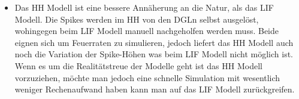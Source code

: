 \documentclass[conference]{IEEEtran}
\begin{document}
\begin{itemize}
\item Das HH Modell ist eine bessere Annäherung an die Natur, als das LIF Modell. Die Spikes werden im HH von den DGLn selbst ausgelöst, wohingegen beim LIF Modell manuell nachgeholfen werden muss. Beide eignen sich um Feuerraten zu simulieren, jedoch liefert das HH Modell auch noch die Variation der Spike-Höhen was beim LIF Modell nicht möglich ist. Wenn es um die Realitätstreue der Modelle geht ist das HH Modell vorzuziehen, möchte man jedoch eine schnelle Simulation mit wesentlich weniger Rechenaufwand haben kann man auf das LIF Modell zurückgreifen.
\end{itemize}
\end{document}

